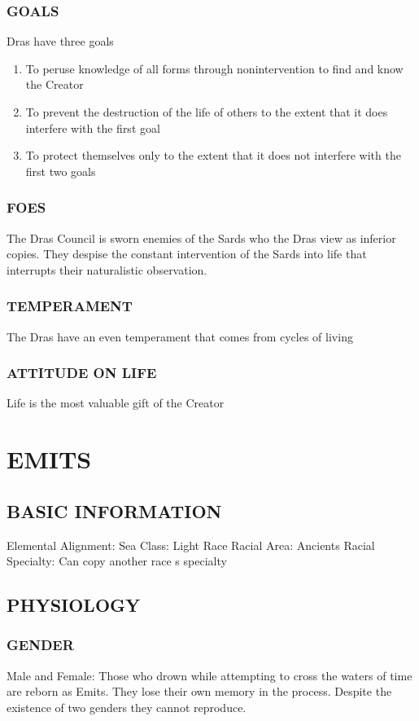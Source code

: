 \subsubsection{GOALS}
Dras have three goals
\begin{enumerate}
\item To peruse knowledge of all forms through nonintervention to find and know the Creator
\item To prevent the destruction of the life of others to the extent that it does interfere with the first goal
\item To protect themselves only to the extent that it does not interfere with the first two goals
\end{enumerate}
\subsubsection{FOES}
The Dras Council is sworn enemies of the Sards who the Dras view as inferior
copies.  They despise the constant intervention of the Sards into life that
interrupts their naturalistic observation.
\subsubsection{TEMPERAMENT}
The Dras have an even temperament that comes from cycles of living
\subsubsection{ATTITUDE ON LIFE}
Life is the most valuable gift of the Creator
\section{EMITS}
\subsection{BASIC INFORMATION}
Elemental Alignment: Sea
Class: Light Race
Racial Area: Ancients
Racial Specialty: Can copy another race s specialty
\subsection{PHYSIOLOGY}
\subsubsection{GENDER }
Male and Female:  Those who drown while attempting to cross the waters of time
are reborn as Emits.  They lose their own memory in the process.  Despite the
existence of two genders they cannot reproduce.

